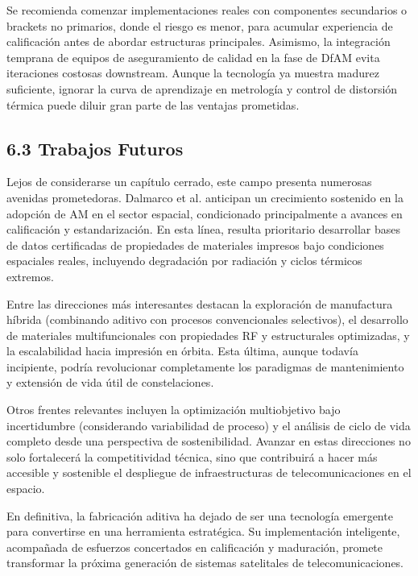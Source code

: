 Se recomienda comenzar implementaciones reales con componentes secundarios o brackets no primarios, donde el riesgo es menor, para acumular experiencia de calificación antes de abordar estructuras principales. Asimismo, la integración temprana de equipos de aseguramiento de calidad en la fase de DfAM evita iteraciones costosas downstream. Aunque la tecnología ya muestra madurez suficiente, ignorar la curva de aprendizaje en metrología y control de distorsión térmica puede diluir gran parte de las ventajas prometidas.

\subsection{6.3 Trabajos Futuros}

Lejos de considerarse un capítulo cerrado, este campo presenta numerosas avenidas prometedoras. Dalmarco et al. \cite{Dalmarco2026} anticipan un crecimiento sostenido en la adopción de AM en el sector espacial, condicionado principalmente a avances en calificación y estandarización. En esta línea, resulta prioritario desarrollar bases de datos certificadas de propiedades de materiales impresos bajo condiciones espaciales reales, incluyendo degradación por radiación y ciclos térmicos extremos.

Entre las direcciones más interesantes destacan la exploración de manufactura híbrida (combinando aditivo con procesos convencionales selectivos), el desarrollo de materiales multifuncionales con propiedades RF y estructurales optimizadas, y la escalabilidad hacia impresión en órbita. Esta última, aunque todavía incipiente, podría revolucionar completamente los paradigmas de mantenimiento y extensión de vida útil de constelaciones.

Otros frentes relevantes incluyen la optimización multiobjetivo bajo incertidumbre (considerando variabilidad de proceso) y el análisis de ciclo de vida completo desde una perspectiva de sostenibilidad. Avanzar en estas direcciones no solo fortalecerá la competitividad técnica, sino que contribuirá a hacer más accesible y sostenible el despliegue de infraestructuras de telecomunicaciones en el espacio.

En definitiva, la fabricación aditiva ha dejado de ser una tecnología emergente para convertirse en una herramienta estratégica. Su implementación inteligente, acompañada de esfuerzos concertados en calificación y maduración, promete transformar la próxima generación de sistemas satelitales de telecomunicaciones.